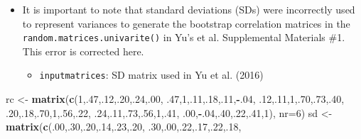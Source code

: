 \documentclass[]{article}
\newenvironment{Shaded}{\begin{snugshade}}{\end{snugshade}}
\newcommand{\KeywordTok}[1]{\textcolor[rgb]{0.13,0.29,0.53}{\textbf{#1}}}
\newcommand{\DataTypeTok}[1]{\textcolor[rgb]{0.13,0.29,0.53}{#1}}
\newcommand{\DecValTok}[1]{\textcolor[rgb]{0.00,0.00,0.81}{#1}}
\newcommand{\StringTok}[1]{\textcolor[rgb]{0.31,0.60,0.02}{#1}}
\newcommand{\OperatorTok}[1]{\textcolor[rgb]{0.81,0.36,0.00}{\textbf{#1}}}
\newcommand{\NormalTok}[1]{#1}
\providecommand{\tightlist}{%
  \setlength{\itemsep}{0pt}\setlength{\parskip}{0pt}}
\begin{document}
\begin{itemize}
\tightlist
\item
  It is important to note that standard deviations (SDs) were
  incorrectly used to represent variances to generate the bootstrap
  correlation matrices in the \texttt{random.matrices.univarite()} in
  Yu's et al. Supplemental Materials \#1. This error is corrected here.

  \begin{itemize}
  \tightlist
  \item
    \texttt{inputmatrices}: SD matrix used in Yu et al. (2016)
  \end{itemize}
\end{itemize}

\begin{Shaded}
\begin{Highlighting}[]
\NormalTok{rc <-}\StringTok{ }\KeywordTok{matrix}\NormalTok{(}\KeywordTok{c}\NormalTok{(}\DecValTok{1}\NormalTok{,.}\DecValTok{47}\NormalTok{,.}\DecValTok{12}\NormalTok{,.}\DecValTok{20}\NormalTok{,.}\DecValTok{24}\NormalTok{,.}\DecValTok{00}\NormalTok{,}
\NormalTok{               .}\DecValTok{47}\NormalTok{,}\DecValTok{1}\NormalTok{,.}\DecValTok{11}\NormalTok{,.}\DecValTok{18}\NormalTok{,.}\DecValTok{11}\NormalTok{,}\OperatorTok{-}\NormalTok{.}\DecValTok{04}\NormalTok{,}
\NormalTok{               .}\DecValTok{12}\NormalTok{,.}\DecValTok{11}\NormalTok{,}\DecValTok{1}\NormalTok{,.}\DecValTok{70}\NormalTok{,.}\DecValTok{73}\NormalTok{,.}\DecValTok{40}\NormalTok{,}
\NormalTok{               .}\DecValTok{20}\NormalTok{,.}\DecValTok{18}\NormalTok{,.}\DecValTok{70}\NormalTok{,}\DecValTok{1}\NormalTok{,.}\DecValTok{56}\NormalTok{,.}\DecValTok{22}\NormalTok{,}
\NormalTok{               .}\DecValTok{24}\NormalTok{,.}\DecValTok{11}\NormalTok{,.}\DecValTok{73}\NormalTok{,.}\DecValTok{56}\NormalTok{,}\DecValTok{1}\NormalTok{,.}\DecValTok{41}\NormalTok{,}
\NormalTok{               .}\DecValTok{00}\NormalTok{,}\OperatorTok{-}\NormalTok{.}\DecValTok{04}\NormalTok{,.}\DecValTok{40}\NormalTok{,.}\DecValTok{22}\NormalTok{,.}\DecValTok{41}\NormalTok{,}\DecValTok{1}\NormalTok{), }\DataTypeTok{nr=}\DecValTok{6}\NormalTok{)}
\NormalTok{sd <-}\StringTok{ }\KeywordTok{matrix}\NormalTok{(}\KeywordTok{c}\NormalTok{(.}\DecValTok{00}\NormalTok{,.}\DecValTok{30}\NormalTok{,.}\DecValTok{20}\NormalTok{,.}\DecValTok{14}\NormalTok{,.}\DecValTok{23}\NormalTok{,.}\DecValTok{20}\NormalTok{,}
\NormalTok{              .}\DecValTok{30}\NormalTok{,.}\DecValTok{00}\NormalTok{,.}\DecValTok{22}\NormalTok{,.}\DecValTok{17}\NormalTok{,.}\DecValTok{22}\NormalTok{,.}\DecValTok{18}\NormalTok{,}

\end{Highlighting}
\end{Shaded}
\end{document}
